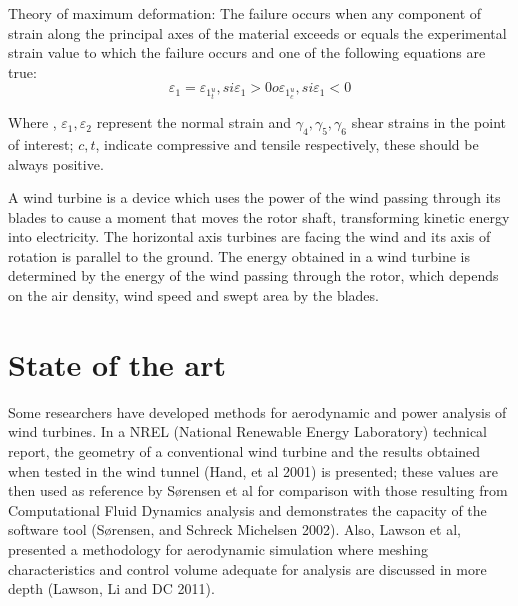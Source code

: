 Theory of maximum deformation: The failure occurs when any component of strain along the principal axes of the material exceeds or equals the experimental strain value to which the failure occurs and one of the following equations are true:
\begin{equation}
\varepsilon_1=\varepsilon_1_t^u,  si  \varepsilon_1>0  o  \varepsilon_1_c^u,  si  \varepsilon_1<0
\end{equation}

Where , $\varepsilon_1, \varepsilon_2$ represent the normal strain and $\gamma_4, \gamma_5, \gamma_6$ shear strains in the point of interest; $c, t$, indicate compressive and tensile respectively,  these should be always positive.

A wind turbine is a device which uses the power of the wind passing through its blades to cause a moment that moves the rotor shaft, transforming kinetic energy into electricity. The horizontal axis turbines are facing the wind and its axis of rotation is parallel to the ground. The energy obtained in a wind turbine is determined by the energy of the wind passing through the rotor, which depends on the air density, wind speed and swept area by the blades.

\section{State of the art}
Some researchers have developed methods for aerodynamic and power analysis of wind turbines. In a NREL (National Renewable Energy Laboratory) technical report, the geometry of a conventional wind turbine and the results obtained when tested in the wind tunnel (Hand, et al 2001) is presented; these values are then used as reference by Sørensen et al for comparison with those resulting from Computational Fluid Dynamics analysis and demonstrates the capacity of the software tool (Sørensen, and Schreck Michelsen 2002). Also, Lawson et al, presented a methodology for aerodynamic simulation where meshing characteristics and control volume adequate for analysis are discussed in more depth (Lawson, Li and DC 2011).


